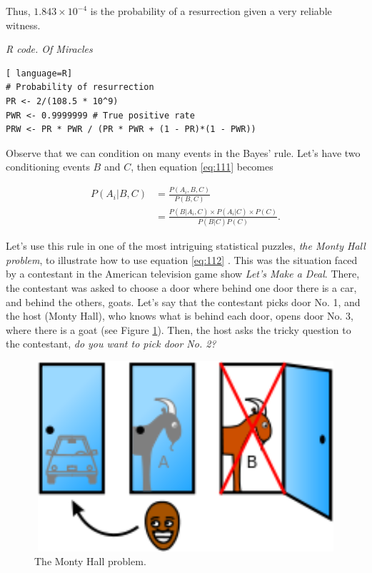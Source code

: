 Thus, $1.843\times 10^{-4}$ is the probability of a resurrection given a very reliable witness.

\begin{tcolorbox}[enhanced,width=4.67in,center upper,
	fontupper=\large\bfseries,drop shadow southwest,sharp corners]
\textit{R code. Of Miracles}
\begin{VF}
\begin{lstlisting}[ language=R]
# Probability of resurrection
PR <- 2/(108.5 * 10^9) 
PWR <- 0.9999999 # True positive rate
PRW <- PR * PWR / (PR * PWR + (1 - PR)*(1 - PWR)) 
\end{lstlisting}
\end{VF}
\end{tcolorbox}

Observe that we can condition on many events in the Bayes' rule. Let's have two conditioning events $B$ and $C$, then equation \ref{eq:111} becomes

\begin{align}
	P(A_i|B,C)&=\frac{P(A_i,B,C)}{P(B,C)}\nonumber\\
	&=\frac{P(B|A_i,C) \times P(A_i|C) \times P(C)}{P(B|C)P(C)}.
	\label{eq:112}
\end{align}

Let's use this rule in one of the most intriguing statistical puzzles, \textit{the Monty Hall problem}, to illustrate how to use equation \ref{eq:112} \cite{selvin1975problem,selvin1975bproblem}. This was the situation faced by a contestant in the American television game show \textit{Let's Make a Deal}. There, the contestant was asked to choose a door where behind one door there is a car, and behind the others, goats. Let's say that the contestant picks door No. 1, and the host (Monty Hall), who knows what is behind each door, opens door No. 3, where there is a goat (see Figure \ref{fig11}). Then, the host asks the tricky question to the contestant, \textit{do you want to pick door No. 2?}

\begin{figure}
	\includegraphics[width=340pt, height=200pt]{Chapters/chapter1/figures/MHproblem.png}
	\caption[List of figure caption goes here]{The Monty Hall problem.}\label{fig11}
\end{figure}

